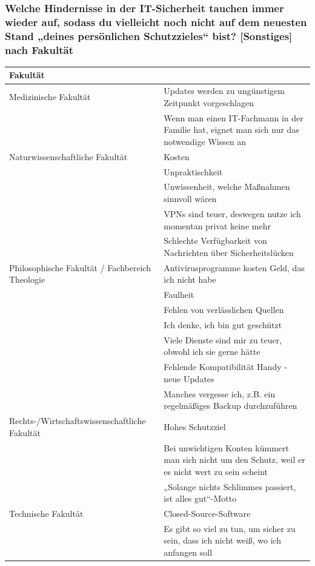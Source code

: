 \documentclass[german,report]{i1thesis}
\begin{document}
\subsubsection*{Welche Hindernisse in der IT-Sicherheit tauchen immer wieder auf, sodass du vielleicht noch nicht auf dem neuesten Stand „deines persönlichen Schutzzieles“ bist? [Sonstiges] nach Fakultät}
\begin{longtable}{|p{5cm}|p{9cm}|}
\hline
Fakultät & \\
\hline
Medizinische Fakultät & Updates werden zu ungünstigem Zeitpunkt vorgeschlagen \\ \cline{2-2}
 & Wenn man einen IT-Fachmann in der Familie hat, eignet man sich nur das notwendige Wissen an \\
\hline
Naturwissenschaftliche Fakultät & Kosten \\ \cline{2-2}
 & Unpraktischkeit \\ \cline{2-2}
 & Unwissenheit, welche Maßnahmen sinnvoll wären \\ \cline{2-2}
 & VPNs sind teuer, deswegen nutze ich momentan privat keine mehr \\ \cline{2-2}
 & Schlechte Verfügbarkeit von Nachrichten über Sicherheitslücken \\
\hline
Philosophische Fakultät / Fachbereich Theologie & Antivirusprogramme kosten Geld, das ich nicht habe \\ \cline{2-2}
 & Faulheit \\ \cline{2-2}
 & Fehlen von verlässlichen Quellen \\ \cline{2-2}
 & Ich denke, ich bin gut geschützt \\ \cline{2-2}
 & Viele Dienste sind mir zu teuer, obwohl ich sie gerne hätte \\ \cline{2-2}
 & Fehlende Kompatibilität Handy - neue Updates \\ \cline{2-2}
 & Manches vergesse ich, z.B. ein regelmäßiges Backup durchzuführen \\
\hline
Rechts-/Wirtschaftswissenschaftliche Fakultät & Hohes Schutzziel \\ \cline{2-2}
 & Bei unwichtigen Konten kümmert man sich nicht um den Schutz, weil er es nicht wert zu sein scheint \\ \cline{2-2}
 & „Solange nichts Schlimmes passiert, ist alles gut“-Motto \\
\hline
Technische Fakultät & Closed-Source-Software \\ \cline{2-2}
 & Es gibt so viel zu tun, um sicher zu sein, dass ich nicht weiß, wo ich anfangen soll \\ \cline{2-2}

\end{longtable}
\end{document}
